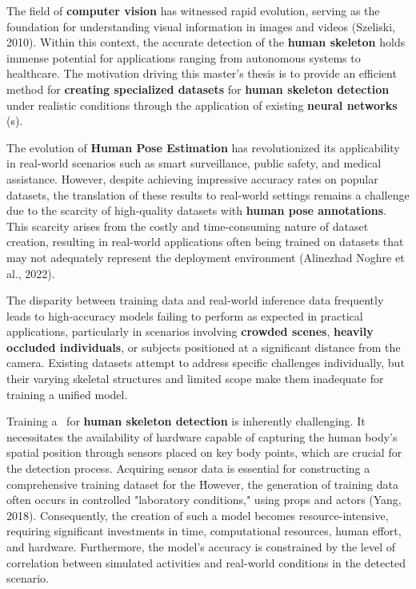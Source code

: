 

The field of {\bf computer vision} has witnessed rapid evolution, serving as the foundation for understanding visual information in images and videos (\scc Szeliski, 2010). Within this context, the accurate detection of the {\bf human skeleton} holds immense potential for applications ranging from autonomous systems to healthcare. The motivation driving this master's thesis is to provide an efficient method for {\bf creating specialized datasets} for {\bf human skeleton detection} under realistic conditions through the application of existing {\bf neural networks} (\NN\-s).

The evolution of {\bf Human Pose Estimation} has revolutionized its applicability in real-world scenarios such as smart surveillance, public safety, and medical assistance. However, despite achieving impressive accuracy rates on popular datasets, the translation of these results to real-world settings remains a challenge due to the scarcity of high-quality datasets with {\bf human pose annotations}. This scarcity arises from the costly and time-consuming nature of dataset creation, resulting in real-world applications often being trained on datasets that may not adequately represent the deployment environment (\scc Alinezhad Noghre et al., 2022).

The disparity between training data and real-world inference data frequently leads to high-accuracy models failing to perform as expected in practical applications, particularly in scenarios involving {\bf crowded scenes}, {\bf heavily occluded individuals}, or subjects positioned at a significant distance from the camera. Existing datasets attempt to address specific challenges individually, but their varying skeletal structures and limited scope make them inadequate for training a unified model.

Training a \NN\ for {\bf human skeleton detection} is inherently challenging. It necessitates the availability of hardware capable of capturing the human body's spatial position through sensors placed on key body points, which are crucial for the detection process. Acquiring sensor data is essential for constructing a comprehensive training dataset for the \NN\. However, the generation of training data often occurs in controlled "laboratory conditions," using props and actors (\scc Yang, 2018). Consequently, the creation of such a model becomes resource-intensive, requiring significant investments in time, computational resources, human effort, and hardware. Furthermore, the model's accuracy is constrained by the level of correlation between simulated activities and real-world conditions in the detected scenario.

